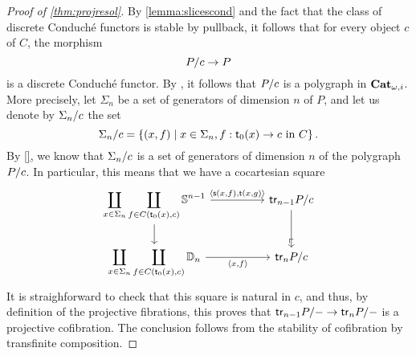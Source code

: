 \begin{proof}[Proof of \cref{thm:projresol}]
By \cref{lemma:slicescond} and the fact that the class of discrete Conduché functors is
stable by pullback, it follows that for every object $c$ of $C$, the
morphism
\[
  P/c \to P
\]
is a discrete Conduché functor. By , it follows that
$P/c$ is a polygraph in $\mathbf{Cat}_{\omega,i}$. More precisely, let
$\Sigma_n$ be a set of generators of dimension $n$ of $P$, and let us
denote by $\Sigma_n/c$ the set
\[
  \Sigma_n/c=\left\{ (x,f)\; | \; x \in \Sigma_n, f : \mathsf{t}_0(x) \to c
    \text{ in }C\right\}.
\]
By \ref{}, we know that $\Sigma_n/c$ is a set of generators of
dimension $n$ of the polygraph $P/c$. In particular, this means
that we have a cocartesian square
\[
  \begin{tikzcd}[column sep=huge]
   \displaystyle \coprod_{x \in \Sigma_n}\coprod_{f \in
     \homset{C}{\target_0(x)}{c}}\Sph{n-1} \ar[d]\ar[r,"{\langle \source(x,f),\target(x,g) \rangle}"]& \trk{n-1}\tr{P}{c} \ar[d]\\
    \displaystyle \coprod_{x \in \Sigma_n}\coprod_{f \in
     \homset{C}{\target_0(x)}{c}}\Dsk{n}\ar[r,"{\langle x,f \rangle}"'] & \trk{n}\tr{P}{c}
\ar[from=1-2,to=2-2,phantom,"\ulcorner", very near end]
 \end{tikzcd}
\]
It is straighforward to check that this square is natural in $c$, and
thus, by definition of the projective fibrations, this proves that
$\mathsf{tr}_{n-1}P/- \to \mathsf{tr}_{n}P/-$ is a projective
cofibration. The conclusion follows from the stability of cofibration
by transfinite composition.
\end{proof}


